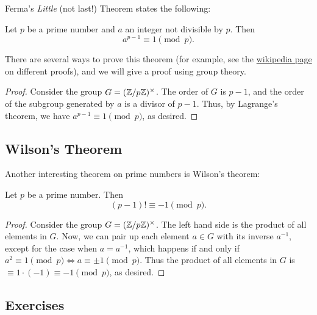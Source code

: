 Ferma's \emph{Little} (not last!) Theorem states the following:
\begin{theorem}
    Let $p$ be a prime number and $a$ an integer not divisible by $p$.
    Then
    \[
        a^{p - 1} \equiv 1 \pmod{p}.
    \]
\end{theorem}

There are several ways to prove this theorem (for example, see the \href{https://en.wikipedia.org/wiki/Proofs_of_Fermat%27s_little_theorem}{wikipedia page} on different proofs), and we will give a proof using group theory.

\begin{proof}
    Consider the group $G = (\mathbb{Z} / p\mathbb{Z})^\times$.
    The order of $G$ is $p - 1$, and the order of the subgroup generated by $a$ is a divisor of $p - 1$.
    Thus, by Lagrange's theorem, we have $a^{p - 1} \equiv 1 \pmod{p}$, as desired.
\end{proof}

\subsection{Wilson's Theorem}
\label{subsec:basicnt_wilson}

Another interesting theorem on prime numbers is Wilson's theorem:
\begin{theorem}
    Let $p$ be a prime number. Then
    \[
        (p - 1)! \equiv -1 \pmod{p}.
    \]
\end{theorem}
\begin{proof}
    Consider the group $G = (\mathbb{Z} / p\mathbb{Z})^\times$.
    The left hand side is the product of all elements in $G$.
    Now, we can pair up each element $a \in G$ with its inverse $a^{-1}$, except for the case when $a = a^{-1}$, which happens if and only if $a^2 \equiv 1 \pmod{p} \Leftrightarrow a \equiv \pm 1 \pmod{p}$.
    Thus the product of all elements in $G$ is $\equiv 1 \cdot (-1) \equiv -1 \pmod{p}$, as desired.
\end{proof}

\subsection*{Exercises}


